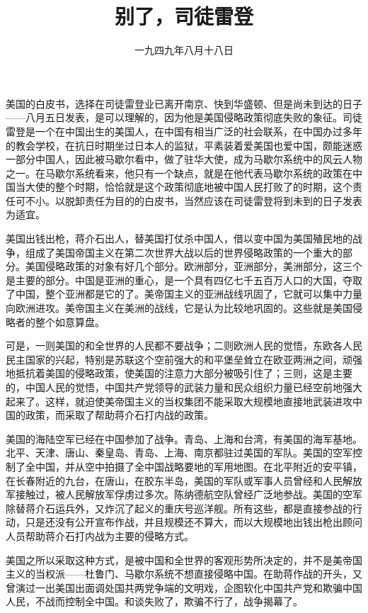 
\title{别了，司徒雷登}
\date{一九四九年八月十八日}
\maketitle


美国的白皮书，选择在司徒雷登业已离开南京、快到华盛顿、但是尚未到达的日子——八月五日发表，是可以理解的，因为他是美国侵略政策彻底失败的象征。司徒雷登是一个在中国出生的美国人，在中国有相当广泛的社会联系，在中国办过多年的教会学校，在抗日时期坐过日本人的监狱，平素装着爱美国也爱中国，颇能迷惑一部分中国人，因此被马歇尔看中，做了驻华大使，成为马歇尔系统中的风云人物之一。在马歇尔系统看来，他只有一个缺点，就是在他代表马歇尔系统的政策在中国当大使的整个时期，恰恰就是这个政策彻底地被中国人民打败了的时期，这个责任可不小。以脱卸责任为目的的白皮书，当然应该在司徒雷登将到未到的日子发表为适宜。

美国出钱出枪，蒋介石出人，替美国打仗杀中国人，借以变中国为美国殖民地的战争，组成了美国帝国主义在第二次世界大战以后的世界侵略政策的一个重大的部分。美国侵略政策的对象有好几个部分。欧洲部分，亚洲部分，美洲部分，这三个是主要的部分。中国是亚洲的重心，是一个具有四亿七千五百万人口的大国，夺取了中国，整个亚洲都是它的了。美帝国主义的亚洲战线巩固了，它就可以集中力量向欧洲进攻。美帝国主义在美洲的战线，它是认为比较地巩固的。这些就是美国侵略者的整个如意算盘。

可是，一则美国的和全世界的人民都不要战争；二则欧洲人民的觉悟，东欧各人民民主国家的兴起，特别是苏联这个空前强大的和平堡垒耸立在欧亚两洲之间，顽强地抵抗着美国的侵略政策，使美国的注意力大部分被吸引住了；三则，这是主要的，中国人民的觉悟，中国共产党领导的武装力量和民众组织力量已经空前地强大起来了。这样，就迫使美帝国主义的当权集团不能采取大规模地直接地武装进攻中国的政策，而采取了帮助蒋介石打内战的政策。

美国的海陆空军已经在中国参加了战争。青岛、上海和台湾，有美国的海军基地。北平、天津、唐山、秦皇岛、青岛、上海、南京都驻过美国的军队。美国的空军控制了全中国，并从空中拍摄了全中国战略要地的军用地图。在北平附近的安平镇，在长春附近的九台，在唐山，在胶东半岛，美国的军队或军事人员曾经和人民解放军接触过，被人民解放军俘虏过多次。陈纳德航空队曾经广泛地参战。美国的空军除替蒋介石运兵外，又炸沉了起义的重庆号巡洋舰。所有这些，都是直接参战的行动，只是还没有公开宣布作战，并且规模还不算大，而以大规模地出钱出枪出顾问人员帮助蒋介石打内战为主要的侵略方式。

美国之所以采取这种方式，是被中国和全世界的客观形势所决定的，并不是美帝国主义的当权派——杜鲁门、马歇尔系统不想直接侵略中国。在助蒋作战的开头，又曾演过一出美国出面调处国共两党争端的文明戏，企图软化中国共产党和欺骗中国人民，不战而控制全中国。和谈失败了，欺骗不行了，战争揭幕了。

